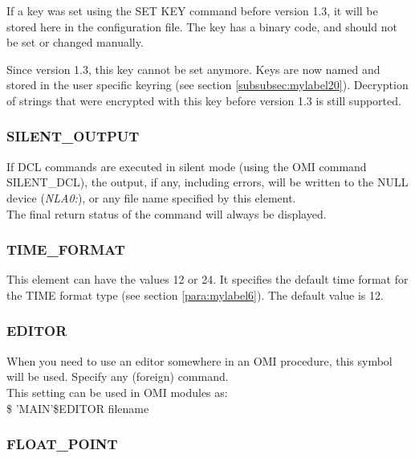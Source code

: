 \documentclass[a4paper]{book}
\newcommand{\vs}{\vspace{3mm}}
\renewcommand{\indent}{\hspace*{5mm}}
\begin{document}
If a key was set using the \textsf{SET KEY} command 
before version 1.3, it will be stored here in the configuration file. The 
key has a binary code, and should not be set or changed manually.

\vs

Since version 1.3, this key cannot be set anymore. Keys are now named and 
stored in the user specific keyring (see section \ref{subsubsec:mylabel20}). \newline
Decryption of strings that were encrypted  with this key before version 1.3 is
still supported.

\subsubsection{SILENT{\_}OUTPUT}

If DCL commands are executed in silent mode (using the OMI command 
\textsf{SILENT{\_}DCL}), the output, if any, 
including errors, will be written to the NULL device (\textsl{NLA0:}),
or any file name specified by this element. \\
The final return status of the command will always be displayed.

\subsubsection{TIME{\_}FORMAT}
\label{para:mylabel1}

This element can have the values 12 or 24. It specifies the default time 
format for the TIME format type (see section \ref{para:mylabel6}). The
default value is 12.

\subsubsection{EDITOR}
\label{para:editorlement}

When you need to use an editor somewhere in an OMI procedure, this symbol 
will be used. Specify any (foreign) command. \\
This setting can be used in OMI modules as: \\
\indent\textsf{{\$} 'MAIN'{\$}EDITOR filename}

\subsubsection{FLOAT{\_}POINT}
\label{para:float}
\end{document}
